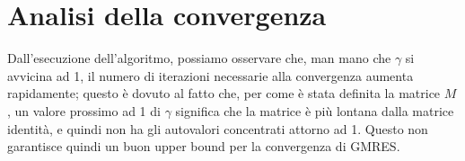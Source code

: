 \documentclass[a4paper]{article}
\theoremstyle{definition}
\theoremstyle{definition}
\theoremstyle{remark}
\theoremstyle{definition}
\begin{document}
\section{Analisi della convergenza}
Dall'esecuzione dell'algoritmo, possiamo osservare che, man mano che $\gamma$ si avvicina ad 1, il numero di iterazioni necessarie alla convergenza aumenta rapidamente; questo
è dovuto al fatto che, per come è stata definita la matrice $M$, un valore prossimo ad 1 di $\gamma$ significa che la matrice è più lontana dalla matrice identità, e quindi non ha gli
autovalori concentrati attorno ad 1. Questo non garantisce quindi un buon upper bound per la convergenza di GMRES.
\end{document}
